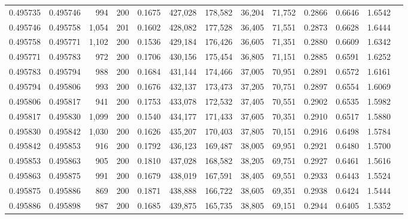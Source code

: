 \begin{tabular}{rrrrrrrrrrrrr}
0.495735 & 0.495746 &    994 & 200 &                                     0.1675 & 427,028 & 178,582 &  36,204 &  71,752 & 0.2866 & 0.6646 & 1.6542 \\
0.495746 & 0.495758 &  1,054 & 201 &                                     0.1602 & 428,082 & 177,528 &  36,405 &  71,551 & 0.2873 & 0.6628 & 1.6444 \\
0.495758 & 0.495771 &  1,102 & 200 &                                     0.1536 & 429,184 & 176,426 &  36,605 &  71,351 & 0.2880 & 0.6609 & 1.6342 \\
0.495771 & 0.495783 &    972 & 200 &                                     0.1706 & 430,156 & 175,454 &  36,805 &  71,151 & 0.2885 & 0.6591 & 1.6252 \\
0.495783 & 0.495794 &    988 & 200 &                                     0.1684 & 431,144 & 174,466 &  37,005 &  70,951 & 0.2891 & 0.6572 & 1.6161 \\
0.495794 & 0.495806 &    993 & 200 &                                     0.1676 & 432,137 & 173,473 &  37,205 &  70,751 & 0.2897 & 0.6554 & 1.6069 \\
0.495806 & 0.495817 &    941 & 200 &                                     0.1753 & 433,078 & 172,532 &  37,405 &  70,551 & 0.2902 & 0.6535 & 1.5982 \\
0.495817 & 0.495830 &  1,099 & 200 &                                     0.1540 & 434,177 & 171,433 &  37,605 &  70,351 & 0.2910 & 0.6517 & 1.5880 \\
0.495830 & 0.495842 &  1,030 & 200 &                                     0.1626 & 435,207 & 170,403 &  37,805 &  70,151 & 0.2916 & 0.6498 & 1.5784 \\
0.495842 & 0.495853 &    916 & 200 &                                     0.1792 & 436,123 & 169,487 &  38,005 &  69,951 & 0.2921 & 0.6480 & 1.5700 \\
0.495853 & 0.495863 &    905 & 200 &                                     0.1810 & 437,028 & 168,582 &  38,205 &  69,751 & 0.2927 & 0.6461 & 1.5616 \\
0.495863 & 0.495875 &    991 & 200 &                                     0.1679 & 438,019 & 167,591 &  38,405 &  69,551 & 0.2933 & 0.6443 & 1.5524 \\
0.495875 & 0.495886 &    869 & 200 &                                     0.1871 & 438,888 & 166,722 &  38,605 &  69,351 & 0.2938 & 0.6424 & 1.5444 \\
0.495886 & 0.495898 &    987 & 200 &                                     0.1685 & 439,875 & 165,735 &  38,805 &  69,151 & 0.2944 & 0.6405 & 1.5352 \\

\end{tabular}
